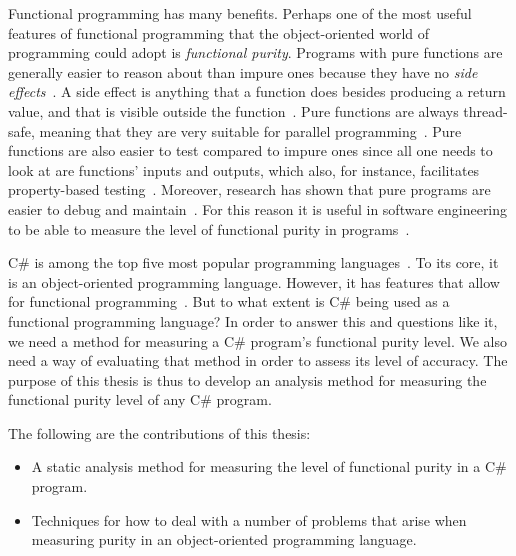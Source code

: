 \documentclass[a4paper,12pt]{article}
\begin{document}
Functional programming has many benefits. Perhaps one of the most useful features of functional programming that the object-oriented world of programming could adopt is \textit{functional purity}. Programs with pure functions are generally easier to reason about than impure ones because they have no \textit{side effects}~\cite{alvin-alexander}. A side effect is anything that a function does besides producing a return value, and that is visible outside the function~\cite{purity-in-java}. Pure functions are always thread-safe, meaning that they are very suitable for parallel programming~\cite{purity-in-java}. Pure functions are also easier to test compared to impure ones since all one needs to look at are functions' inputs and outputs, which also, for instance, facilitates property-based testing~\cite{alvin-alexander}. Moreover, research has shown that pure programs are easier to debug and maintain~\cite{purity-in-javascript}. %
For this reason it is useful in software engineering to be able to measure the level of functional purity in programs~\cite{purity-in-javascript}.

C\# is among the top five most popular programming languages~\cite{tiobe}. To its core, it is an object-oriented programming language. However, it has features that allow for functional programming~\cite{hamid-mosalla}. But to what extent is C\# being used as a functional programming language?
In order to answer this and questions like it, we need a method for measuring a C\# program's functional purity level. We also need a way of evaluating that method in order to assess its level of accuracy. The purpose of this thesis is thus to develop an analysis method for measuring the functional purity level of any C\# program.

The following are the contributions of this thesis:

\begin{itemize}
  \item A static analysis method for measuring the level of functional purity in a C\# program.
  \item Techniques for how to deal with a number of problems that arise when measuring purity in an object-oriented programming language.
\end{itemize}
\end{document}
